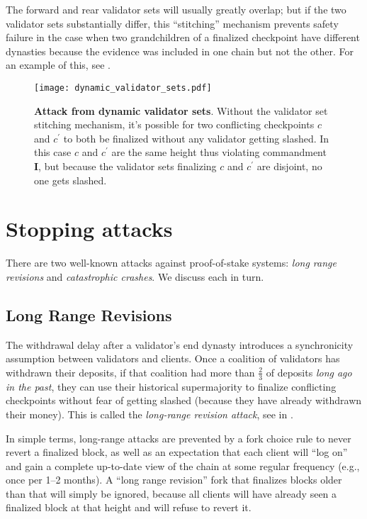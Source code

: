 \documentclass[12pt]{article}
\begin{document}
The forward and rear validator sets will usually greatly overlap; but if the two validator sets substantially differ, this ``stitching'' mechanism prevents safety failure in the case when two grandchildren of a finalized checkpoint have different dynasties because the evidence was included in one chain but not the other.  For an example of this, see .

\begin{figure}[htb]
\centering
\texttt{[image: dynamic\_validator\_sets.pdf]}
\caption{\textbf{Attack from dynamic validator sets}.  Without the validator set stitching mechanism, it's possible for two conflicting checkpoints $c$ and $c^\prime$ to both be finalized without any validator getting  slashed.  In this case $c$ and $c^\prime$ are the same height thus violating commandment \textbf{I}, but because the validator sets finalizing $c$ and $c^\prime$ are disjoint, no one gets slashed.}
\label{fig:DYN}
\end{figure}


\section{Stopping attacks}
\label{sect:attacks}
There are two well-known attacks against proof-of-stake systems: \emph{long range revisions} and \emph{catastrophic crashes}.  We discuss each in turn.

\subsection{Long Range Revisions}
The withdrawal delay after a validator's end dynasty introduces a synchronicity assumption between validators and clients. Once a coalition of validators has withdrawn their deposits, if that coalition had more than $\frac{2}{3}$ of deposits \emph{long ago in the past}, they can use their historical supermajority to finalize conflicting checkpoints without fear of getting slashed (because they have already withdrawn their money).  This is called the \emph{long-range revision attack}, see in .

In simple terms, long-range attacks are prevented by a fork choice rule to never revert a finalized block, as well as an expectation that each client will ``log on'' and gain a complete up-to-date view of the chain at some regular frequency (e.g., once per 1--2 months). A ``long range revision'' fork that finalizes blocks older than that will simply be ignored, because all clients will have already seen a finalized block at that height and will refuse to revert it.
\end{document}
